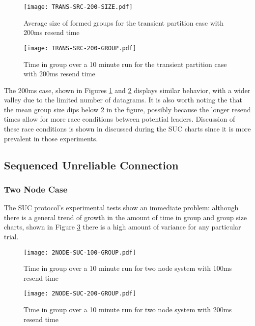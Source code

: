 \begin{figure}[!h]
\centering
\texttt{[image: TRANS-SRC-200-SIZE.pdf]}
\caption{Average size of formed groups for the transient partition case with 200ms resend time}
\label{fig:MGS-SRC-TRANS-200}
\end{figure}

\begin{figure}[!h]
\centering
\texttt{[image: TRANS-SRC-200-GROUP.pdf]}
\caption{Time in group over a 10 minute run for the transient partition case with 200ms resend time}
\label{fig:IGT-SRC-TRANS-200}
\end{figure}

The 200ms case, shown in Figures \ref{fig:MGS-SRC-TRANS-200} and \ref{fig:IGT-SRC-TRANS-200} displays similar behavior, with a wider valley due to the
limited number of datagrams. It is also worth noting the that the mean group
size dips below 2 in the figure, possibly because the longer resend times allow
for more race conditions between potential leaders. Discussion of these race
conditions is shown in discussed during the SUC charts since it is more prevalent
in those experiments.

\subsection{Sequenced Unreliable Connection}

\subsubsection{Two Node Case}

The SUC protocol's experimental tests show an immediate problem: although there
is a general trend of growth in the amount of time in group and group size
charts, shown in Figure \ref{fig:IGT-SUC-2NODE-100}
there is a high amount of variance for any particular trial.

\begin{figure}[!h]
\centering
\texttt{[image: 2NODE-SUC-100-GROUP.pdf]}
\caption{Time in group over a 10 minute run for two node system with 100ms resend time}
\label{fig:IGT-SUC-2NODE-100}
\end{figure}

\begin{figure}[!h]
\centering
\texttt{[image: 2NODE-SUC-200-GROUP.pdf]}
\caption{Time in group over a 10 minute run for two node system with 200ms resend time}
\label{fig:IGT-SUC-2NODE-200}
\end{figure}

